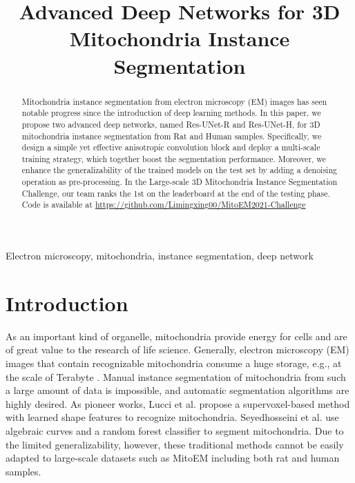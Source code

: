 \documentclass{article}
\title{Advanced Deep Networks for 3D Mitochondria Instance Segmentation}
\begin{document}
\maketitle
\begin{abstract}
Mitochondria instance segmentation from electron microscopy (EM) images has seen notable progress since the introduction of deep learning methods. In this paper, we propose two advanced deep networks, named Res-UNet-R and Res-UNet-H, for 3D mitochondria instance segmentation from Rat and Human samples. Specifically, we design a simple yet effective anisotropic convolution block and deploy a multi-scale training strategy, which together boost the segmentation performance. Moreover, we enhance the generalizability of the trained models on the test set by adding a denoising operation as pre-processing. In the Large-scale 3D Mitochondria Instance Segmentation Challenge, our team ranks the 1st on the leaderboard at the end of the testing phase. Code is available at \url{https://github.com/Limingxing00/MitoEM2021-Challenge}




\end{abstract}
\begin{keywords}
Electron microscopy, mitochondria, instance segmentation, deep network
\end{keywords}

\section{Introduction}
\label{sec:introduction}
As an important kind of organelle, mitochondria provide energy for cells and are of great value to the research of life science. Generally, electron microscopy (EM) images that contain recognizable mitochondria  consume a huge storage, e.g., at the scale of Terabyte \cite{motta2019dense}.
Manual instance segmentation of mitochondria from such a large amount of data is  impossible, and automatic segmentation algorithms are highly desired. As pioneer works,
Lucci et al. \cite{lucchi2011supervoxel} propose a supervoxel-based method with learned  shape features to recognize mitochondria.
Seyedhosseini et al. \cite{seyedhosseini2013segmentation} use algebraic curves and a random forest classifier to segment mitochondria. 
Due to the limited generalizability, however, these traditional methods cannot be easily adapted to large-scale datasets such as MitoEM \cite{wei2020mitoem} including both rat and human samples.
\end{document}
